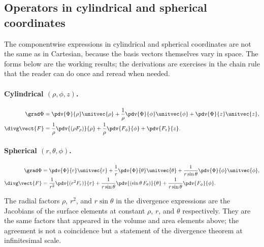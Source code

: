 \subsection{Operators in cylindrical and spherical coordinates}

The componentwise expressions in cylindrical and spherical
coordinates are not the same as in Cartesian, because the basis
vectors themselves vary in space. The forms below are the working
results; the derivations are exercises in the chain rule that the
reader can do once and reread when needed.

\paragraph{Cylindrical $(\rho, \phi, z)$.}
\begin{align*}
\grad\Phi &= \pdv{\Phi}{\rho}\unitvec{\rho} +
  \frac{1}{\rho}\pdv{\Phi}{\phi}\unitvec{\phi} +
  \pdv{\Phi}{z}\unitvec{z}, \\
\divg\vect{F} &= \frac{1}{\rho}\pdv{(\rho F_{\rho})}{\rho} +
  \frac{1}{\rho}\pdv{F_{\phi}}{\phi} + \pdv{F_{z}}{z}.
\end{align*}

\paragraph{Spherical $(r, \theta, \phi)$.}
\begin{align*}
\grad\Phi &= \pdv{\Phi}{r}\unitvec{r} +
  \frac{1}{r}\pdv{\Phi}{\theta}\unitvec{\theta} +
  \frac{1}{r\sin\theta}\pdv{\Phi}{\phi}\unitvec{\phi}, \\
\divg\vect{F} &= \frac{1}{r^{2}}\pdv{(r^{2} F_{r})}{r} +
  \frac{1}{r\sin\theta}\pdv{(\sin\theta\, F_{\theta})}{\theta} +
  \frac{1}{r\sin\theta}\pdv{F_{\phi}}{\phi}.
\end{align*}

The radial factors $\rho$, $r^{2}$, and $r\sin\theta$ in the
divergence expressions are the Jacobians of the surface elements at
constant $\rho$, $r$, and $\theta$ respectively. They are the same
factors that appeared in the volume and area elements above; the
agreement is not a coincidence but a statement of the divergence
theorem at infinitesimal scale.

